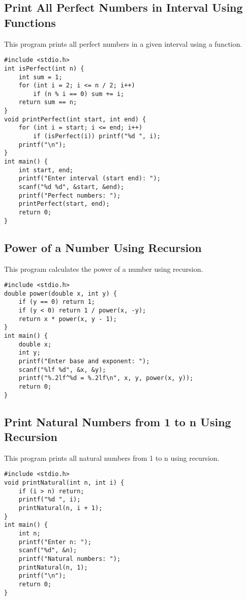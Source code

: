 \documentclass[a4paper,12pt]{article}
\begin{document}
\subsection{Print All Perfect Numbers in Interval Using Functions}
This program prints all perfect numbers in a given interval using a function.
\begin{lstlisting}[caption={Print All Perfect Numbers in Interval Using Functions}]
#include <stdio.h>
int isPerfect(int n) {
    int sum = 1;
    for (int i = 2; i <= n / 2; i++)
        if (n % i == 0) sum += i;
    return sum == n;
}
void printPerfect(int start, int end) {
    for (int i = start; i <= end; i++)
        if (isPerfect(i)) printf("%d ", i);
    printf("\n");
}
int main() {
    int start, end;
    printf("Enter interval (start end): ");
    scanf("%d %d", &start, &end);
    printf("Perfect numbers: ");
    printPerfect(start, end);
    return 0;
}
\end{lstlisting}
\clearpage

\subsection{Power of a Number Using Recursion}
This program calculates the power of a number using recursion.
\begin{lstlisting}[caption={Power of a Number Using Recursion}]
#include <stdio.h>
double power(double x, int y) {
    if (y == 0) return 1;
    if (y < 0) return 1 / power(x, -y);
    return x * power(x, y - 1);
}
int main() {
    double x;
    int y;
    printf("Enter base and exponent: ");
    scanf("%lf %d", &x, &y);
    printf("%.2lf^%d = %.2lf\n", x, y, power(x, y));
    return 0;
}
\end{lstlisting}
\clearpage

\subsection{Print Natural Numbers from 1 to n Using Recursion}
This program prints all natural numbers from 1 to n using recursion.
\begin{lstlisting}[caption={Print Natural Numbers from 1 to n Using Recursion}]
#include <stdio.h>
void printNatural(int n, int i) {
    if (i > n) return;
    printf("%d ", i);
    printNatural(n, i + 1);
}
int main() {
    int n;
    printf("Enter n: ");
    scanf("%d", &n);
    printf("Natural numbers: ");
    printNatural(n, 1);
    printf("\n");
    return 0;
}
\end{lstlisting}
\clearpage
\end{document}
